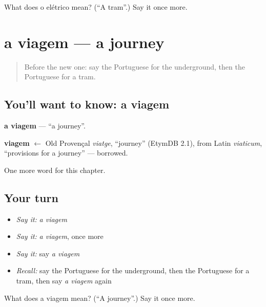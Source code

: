 \begin{tcolorbox}[breakable,colback=teal!4,colframe=teal!35!black,title={Before you move on}]
What does o elétrico mean? (\textquotedblleft{}A tram\textquotedblright{}.) Say it once more.
\end{tcolorbox}
\section[a viagem]{a viagem — a journey}

\label{lesson:PT-C91-viagem}



\begin{quote}
Before the new one: say the Portuguese for the underground, then the Portuguese for a tram.
\end{quote}

\subsection*{You'll want to know: a viagem}
\textbf{a viagem} — \textquotedblleft{}a journey\textquotedblright{}.

\begin{cousinweb}
\textbf{viagem} $\leftarrow$ Old Provençal \emph{viatge}, \textquotedblleft{}journey\textquotedblright{} (EtymDB 2.1), from Latin \emph{viaticum}, \textquotedblleft{}provisions for a journey\textquotedblright{} — borrowed.
\end{cousinweb}

\begin{grammarlens}[title={What you've built}]
One more word for this chapter.
\end{grammarlens}

\subsection*{Your turn}
\begin{itemize}
\raggedright
  \item \emph{Say it:} \emph{a viagem}
  \item \emph{Say it:} \emph{a viagem}, once more
  \item \emph{Say it:} say \emph{a viagem}
  \item \emph{Recall:} say the Portuguese for the underground, then the Portuguese for a tram, then say \emph{a viagem} again
\end{itemize}

\begin{tcolorbox}[breakable,colback=teal!4,colframe=teal!35!black,title={Before you move on}]
What does a viagem mean? (\textquotedblleft{}A journey\textquotedblright{}.) Say it once more.
\end{tcolorbox}
